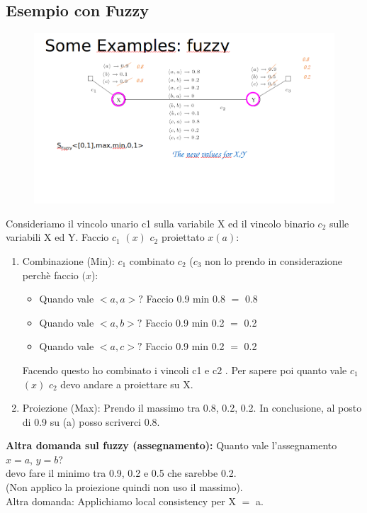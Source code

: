 \subsection{Esempio con Fuzzy}
\begin{figure}[htp]
	\centering
    \includegraphics[width=15cm, keepaspectratio]{latex/img/Cap5/ffuzzy2.png}
\end{figure}
Consideriamo il vincolo unario c1 sulla variabile X ed il vincolo binario $c_2$ sulle variabili X ed Y. Faccio $c_1$ $(x)$ $c_2$ proiettato $x(a)$:
\begin{enumerate}
    \item Combinazione (Min): $c_1$ combinato $c_2$ ($c_3$ non lo prendo in considerazione perchè faccio $(x$):
    \begin{itemize}
        \item Quando vale $< a, a >?$ Faccio 0.9 min 0.8 $=$ 0.8
        \item Quando vale $< a, b >?$ Faccio 0.9 min 0.2 $=$ 0.2
        \item Quando vale $< a, c >?$ Faccio 0.9 min 0.2 $=$ 0.2
    \end{itemize}
    Facendo questo ho combinato i vincoli c1 e c2 . Per sapere poi quanto vale $c_1$ $(x)$ $c_2$ devo andare a proiettare su X.
    \item Proiezione (Max): Prendo il massimo tra 0.8, 0.2, 0.2. In conclusione, al posto di 0.9 su (a) posso scriverci 0.8.
\end{enumerate}
\textbf{Altra domanda sul fuzzy (assegnamento): } Quanto vale l’assegnamento $x=a$, $y=b$? 
\\devo fare il minimo tra 0.9, 0.2 e 0.5 che sarebbe 0.2. 
\\(Non applico la proiezione quindi non uso il massimo).
\\Altra domanda: Applichiamo local consistency per X $=$ a.
